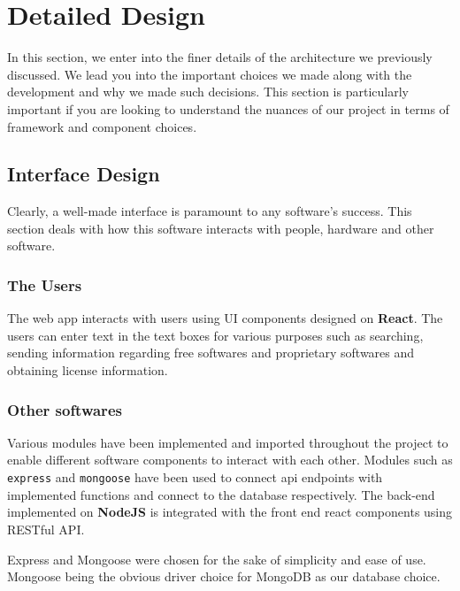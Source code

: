 \chapter{Detailed Design}

In this section, we enter into the finer details of the architecture we previously discussed. We lead you into the important choices we made along with the development and why we made such decisions. This section is particularly important if you are looking to understand the nuances of our project in terms of framework and component choices.


\section{Interface Design}

Clearly, a well-made interface is paramount to any software's success. This section deals with how this software interacts with people, hardware and other software.  

\subsection{The Users}
The web app interacts with users using UI components designed on \textbf{React}\cite{ReactJS}. The users can enter text in the text boxes for various purposes such as searching, sending information regarding free softwares and proprietary softwares and obtaining license information.

\subsection{Other softwares}
Various modules have been implemented and imported throughout the project to enable different software components to interact with each other. Modules such as \texttt{express}\cite{Express} and \texttt{mongoose}\cite{Mongoose} have been used to connect api endpoints with implemented functions and connect to the database respectively. The back-end implemented on \textbf{NodeJS}\cite{NodeJS} is integrated with the front end react components using RESTful API. 

Express and Mongoose were chosen for the sake of simplicity and ease of use. Mongoose being the obvious driver choice for MongoDB as our database choice.

